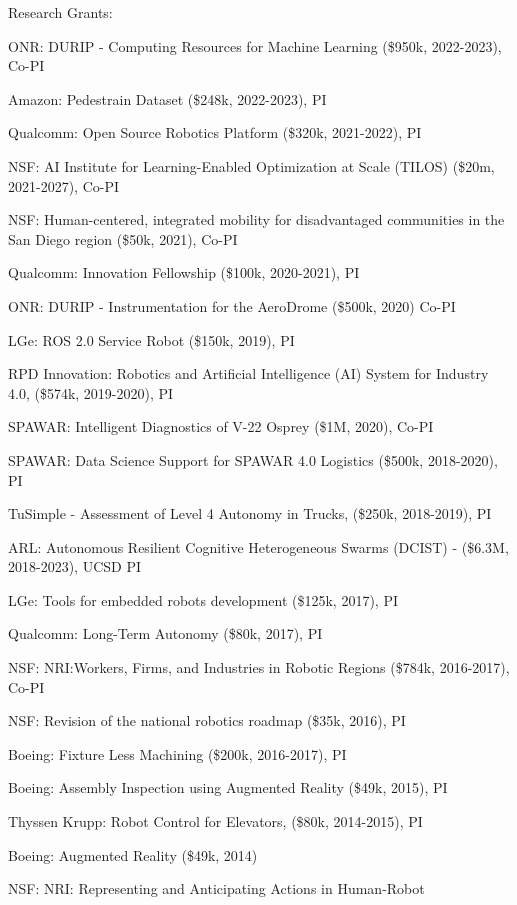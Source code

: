 \documentclass{article}
\begin{document}
\begin{cv}
\begin{cvlist}{Research Grants:}
\item ONR: DURIP - Computing Resources for Machine Learning (\$950k, 2022-2023), Co-PI
\item Amazon: Pedestrain Dataset (\$248k, 2022-2023), PI
\item Qualcomm: Open Source Robotics Platform (\$320k, 2021-2022), PI
\item NSF: AI Institute for Learning-Enabled Optimization at Scale
  (TILOS) (\$20m, 2021-2027), Co-PI
\item NSF: Human-centered, integrated mobility for disadvantaged
  communities in the San Diego region (\$50k, 2021), Co-PI
\item Qualcomm: Innovation Fellowship (\$100k, 2020-2021), PI
\item ONR: DURIP - Instrumentation for the AeroDrome (\$500k, 2020) Co-PI
\item LGe: ROS 2.0 Service Robot (\$150k, 2019), PI
\item RPD Innovation: Robotics and Artificial Intelligence (AI) System for 
  Industry 4.0, (\$574k, 2019-2020), PI 
\item SPAWAR: Intelligent Diagnostics of V-22 Osprey (\$1M, 2020), Co-PI
\item SPAWAR: Data Science Support for SPAWAR 4.0 Logistics (\$500k,
  2018-2020), PI
\item TuSimple - Assessment of Level 4 Autonomy in Trucks,  (\$250k,
  2018-2019), PI
\item ARL: Autonomous Resilient Cognitive Heterogeneous Swarms
  (DCIST) - (\$6.3M, 2018-2023), UCSD PI
\item LGe: Tools for embedded robots development (\$125k, 2017), PI
\item Qualcomm: Long-Term Autonomy (\$80k, 2017), PI
\item NSF: NRI:Workers, Firms, and Industries in Robotic Regions
  (\$784k, 2016-2017), Co-PI
\item NSF: Revision of the national robotics roadmap (\$35k, 2016), PI
\item Boeing: Fixture Less Machining (\$200k, 2016-2017), PI
\item Boeing: Assembly Inspection using Augmented Reality (\$49k,
  2015), PI
\item Thyssen Krupp: Robot Control for Elevators, (\$80k, 2014-2015), PI
\item Boeing: Augmented Reality (\$49k, 2014)
\item NSF: NRI: Representing and Anticipating Actions in Human-Robot

\end{cvlist}
\end{cv}
\end{document}
